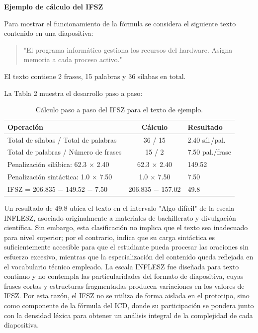 \documentclass[11pt]{article}
\newcommand{\ttstyle}{%
  \small
  \setlength{\tabcolsep}{6pt}%
  \renewcommand{\arraystretch}{1.25}%
  \arrayrulecolor{azulprofundo}%
}
\newcommand{\hairrule}{%
  \arrayrulecolor{azulregla}\midrule[0.3pt]\arrayrulecolor{azulprofundo}%
}
\begin{document}
\textbf{Ejemplo de cálculo del IFSZ}

Para mostrar el funcionamiento de la fórmula se considera el siguiente texto contenido en una diapositiva:
\begin{quote}
"El programa informático gestiona los recursos del hardware. Asigna memoria a cada proceso activo."
\end{quote}
El texto contiene 2 frases, 15 palabras y 36 sílabas en total.

La Tabla 2 muestra el desarrollo paso a paso:

\begin{table}[H]
    \centering
    \ttstyle
    \begin{tabular}{p{5.4cm}cp{3.6cm}}
        \toprule
        \textbf{Operación} & \textbf{Cálculo} & \textbf{Resultado} \\
        \midrule
        Total de sílabas / Total de palabras & 36 / 15 & 2.40 síl./pal. \\
        \hairrule
        Total de palabras / Número de frases & 15 / 2 & 7.50 pal./frase \\
        \hairrule
        Penalización silábica: 62.3 $\times$ 2.40 & 62.3 $\times$ 2.40 & 149.52 \\
        \hairrule
        Penalización sintáctica: 1.0 $\times$ 7.50 & 1.0 $\times$ 7.50 & 7.50 \\
        \hairrule
        IFSZ = 206.835 $-$ 149.52 $-$ 7.50 & 206.835 $-$ 157.02 & 49.8 \\
        \bottomrule
    \end{tabular}
    \caption{Cálculo paso a paso del IFSZ para el texto de ejemplo.}
\end{table}
Un resultado de 49.8 ubica el texto en el intervalo "Algo difícil" de la escala INFLESZ, asociado originalmente a materiales de bachillerato y divulgación científica. Sin embargo, esta clasificación no implica que el texto sea inadecuado para nivel superior; por el contrario, indica que su carga sintáctica es suficientemente accesible para que el estudiante pueda procesar las oraciones sin esfuerzo excesivo, mientras que la especialización del contenido queda reflejada en el vocabulario técnico empleado. La escala INFLESZ fue diseñada para texto continuo y no contempla las particularidades del formato de diapositiva, cuyas frases cortas y estructuras fragmentadas producen variaciones en los valores de IFSZ. Por esta razón, el IFSZ no se utiliza de forma aislada en el prototipo, sino como componente de la fórmula del ICD, donde su participación se pondera junto con la densidad léxica para obtener un análisis integral de la complejidad de cada diapositiva.
\end{document}

